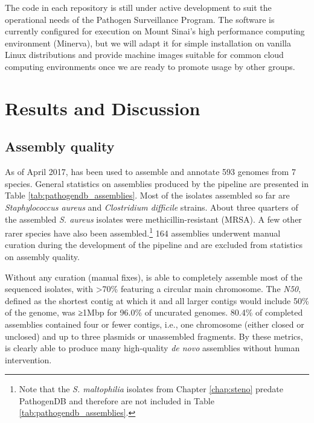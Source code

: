 The code in each repository is still under active development to suit the operational needs of the Pathogen Surveillance Program. The software is currently configured for execution on Mount Sinai's high performance computing environment (Minerva), but we will adapt it for simple installation on vanilla Linux distributions and provide machine images suitable for common cloud computing environments once we are ready to promote usage by other groups.

\section{Results and Discussion}

\subsection{Assembly quality}

As of April 2017, \pathogendbpipeline{} has been used to assemble and annotate 593 genomes from 7 species. General statistics on assemblies produced by the pipeline are presented in Table \ref{tab:pathogendb_assemblies}. Most of the isolates assembled so far are \emph{Staphylococcus aureus} and \emph{Clostridium difficile} strains. About three quarters of the assembled \emph{S. aureus} isolates were methicillin-resistant (MRSA). A few other rarer species have also been assembled.\footnote{Note that the \emph{S. maltophilia} isolates from Chapter \ref{chap:steno} predate PathogenDB and therefore are not included in Table \ref{tab:pathogendb_assemblies}.} 164 assemblies underwent manual curation during the development of the pipeline and are excluded from statistics on assembly quality.

\begin{table}[htb]
  
  \caption[Statistics on assemblies generated by \pathogendbpipeline{} since 2013]{\textbf{Statistics on assemblies generated by \pathogendbpipeline{} since 2013.} $^a$Any contig ≥1Mbp that circularized was considered a chromosome. Abbreviations: N50, shortest contig length above which 50\% of the genome is included; Mbp, 1 million base pairs; kbp, 1 thousand base pairs.
}
  \label{tab:pathogendb_assemblies}
\end{table}

Without any curation (manual fixes), \pathogendbpipeline{} is able to completely assemble most of the sequenced isolates, with >70\% featuring a circular main chromosome. The \emph{N50}, defined as the shortest contig at which it and all larger contigs would include 50\% of the genome, was ≥1Mbp for 96.0\% of uncurated genomes. 80.4\% of completed assemblies contained four or fewer contigs, i.e., one chromosome (either closed or unclosed) and up to three plasmids or unassembled fragments. By these metrics, \pathogendbpipeline{} is clearly able to produce many high-quality \emph{de novo} assemblies without human intervention.

